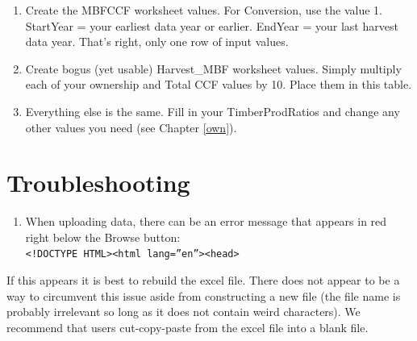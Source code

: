 \documentclass[
  openany]{book}
\providecommand{\tightlist}{%
  \setlength{\itemsep}{0pt}\setlength{\parskip}{0pt}}
\begin{document}
\begin{enumerate}
\def\labelenumi{\arabic{enumi}.}
\tightlist
\item
  Create the MBFCCF worksheet values. For Conversion, use the value 1. StartYear = your earliest data year or earlier. EndYear = your last harvest data year. That's right, only one row of input values.\\
\item
  Create bogus (yet usable) Harvest\_MBF worksheet values. Simply multiply each of your ownership and Total CCF values by 10. Place them in this table.\\
\item
  Everything else is the same. Fill in your TimberProdRatios and change any other values you need (see Chapter \ref{own}).
\end{enumerate}

\hypertarget{ft-trbl}{%
\section{Troubleshooting}\label{ft-trbl}}

\begin{enumerate}
\def\labelenumi{\arabic{enumi}.}
\tightlist
\item
  When uploading data, there can be an error message that appears in red right below the Browse button:\\
  \texttt{\textless{}!DOCTYPE\ HTML\textgreater{}\textless{}html\ lang=”en”\textgreater{}\textless{}head\textgreater{}}
\end{enumerate}

If this appears it is best to rebuild the excel file. There does not appear to be a way to circumvent this issue aside from constructing a new file (the file name is probably irrelevant so long as it does not contain weird characters). We recommend that users cut-copy-paste from the excel file into a blank file.

\printbibliography
\end{document}
